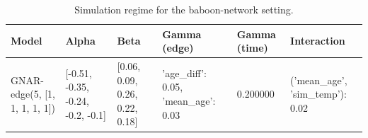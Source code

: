 \begin{table}
\caption{Simulation regime for the baboon-network setting.}
\label{tab:large_regime}
\begin{tabular}{l l l l l l}
\toprule
Model & Alpha & Beta & Gamma (edge) & Gamma (time) & Interaction \\
\midrule
GNAR-edge(5, [1, 1, 1, 1, 1]) & [-0.51, -0.35, -0.24, -0.2, -0.1] & [0.06, 0.09, 0.26, 0.22, 0.18] & {'age_diff': 0.05, 'mean_age': 0.03} & 0.200000 & {('mean_age', 'sim_temp'): 0.02} \\
\bottomrule
\end{tabular}
\end{table}

